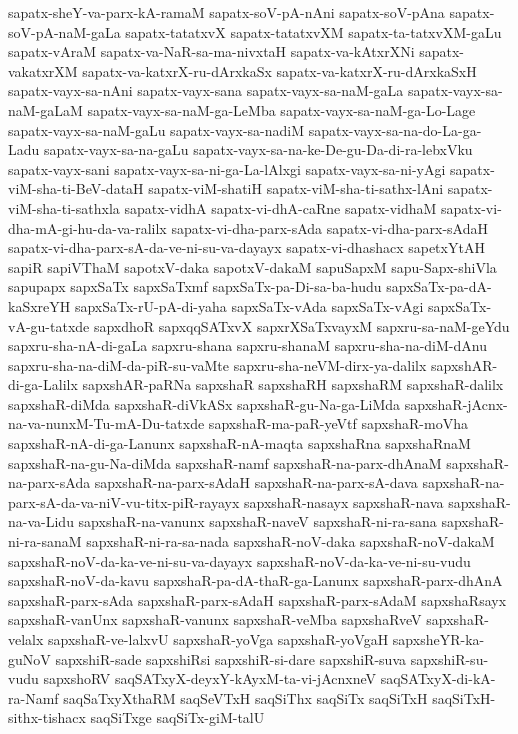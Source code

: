 {sapatx-sheY-va-parx-kA-ramaM
sapatx-soV-pA-nAni
sapatx-soV-pAna
sapatx-soV-pA-naM-gaLa
sapatx-tatatxvX
sapatx-tatatxvXM
sapatx-ta-tatxvXM-gaLu
sapatx-vAraM
sapatx-va-NaR-sa-ma-nivxtaH
sapatx-va-kAtxrXNi
sapatx-vakatxrXM
sapatx-va-katxrX-ru-dArxkaSx
sapatx-va-katxrX-ru-dArxkaSxH
sapatx-vayx-sa-nAni
sapatx-vayx-sana
sapatx-vayx-sa-naM-gaLa
sapatx-vayx-sa-naM-gaLaM
sapatx-vayx-sa-naM-ga-LeMba
sapatx-vayx-sa-naM-ga-Lo-Lage
sapatx-vayx-sa-naM-gaLu
sapatx-vayx-sa-nadiM
sapatx-vayx-sa-na-do-La-ga-Ladu
sapatx-vayx-sa-na-gaLu
sapatx-vayx-sa-na-ke-De-gu-Da-di-ra-lebxVku
sapatx-vayx-sani
sapatx-vayx-sa-ni-ga-La-lAlxgi
sapatx-vayx-sa-ni-yAgi
sapatx-viM-sha-ti-BeV-dataH
sapatx-viM-shatiH
sapatx-viM-sha-ti-sathx-lAni
sapatx-viM-sha-ti-sathxla
sapatx-vidhA
sapatx-vi-dhA-caRne
sapatx-vidhaM
sapatx-vi-dha-mA-gi-hu-da-va-ralilx
sapatx-vi-dha-parx-sAda
sapatx-vi-dha-parx-sAdaH
sapatx-vi-dha-parx-sA-da-ve-ni-su-va-dayayx
sapatx-vi-dhashacx
sapetxYtAH
sapiR
sapiVThaM
sapotxV-daka
sapotxV-dakaM
sapuSapxM
sapu-Sapx-shiVla
sapupapx
sapxSaTx
sapxSaTxmf
sapxSaTx-pa-Di-sa-ba-hudu
sapxSaTx-pa-dA-kaSxreYH
sapxSaTx-rU-pA-di-yaha
sapxSaTx-vAda
sapxSaTx-vAgi
sapxSaTx-vA-gu-tatxde
sapxdhoR
sapxqqSATxvX
sapxrXSaTxvayxM
sapxru-sa-naM-geYdu
sapxru-sha-nA-di-gaLa
sapxru-shana
sapxru-shanaM
sapxru-sha-na-diM-dAnu
sapxru-sha-na-diM-da-piR-su-vaMte
sapxru-sha-neVM-dirx-ya-dalilx
sapxshAR-di-ga-Lalilx
sapxshAR-paRNa
sapxshaR
sapxshaRH
sapxshaRM
sapxshaR-dalilx
sapxshaR-diMda
sapxshaR-diVkASx
sapxshaR-gu-Na-ga-LiMda
sapxshaR-jAcnx-na-va-nunxM-Tu-mA-Du-tatxde
sapxshaR-ma-paR-yeVtf
sapxshaR-moVha
sapxshaR-nA-di-ga-Lanunx
sapxshaR-nA-maqta
sapxshaRna
sapxshaRnaM
sapxshaR-na-gu-Na-diMda
sapxshaR-namf
sapxshaR-na-parx-dhAnaM
sapxshaR-na-parx-sAda
sapxshaR-na-parx-sAdaH
sapxshaR-na-parx-sA-dava
sapxshaR-na-parx-sA-da-va-niV-vu-titx-piR-rayayx
sapxshaR-nasayx
sapxshaR-nava
sapxshaR-na-va-Lidu
sapxshaR-na-vanunx
sapxshaR-naveV
sapxshaR-ni-ra-sana
sapxshaR-ni-ra-sanaM
sapxshaR-ni-ra-sa-nada
sapxshaR-noV-daka
sapxshaR-noV-dakaM
sapxshaR-noV-da-ka-ve-ni-su-va-dayayx
sapxshaR-noV-da-ka-ve-ni-su-vudu
sapxshaR-noV-da-kavu
sapxshaR-pa-dA-thaR-ga-Lanunx
sapxshaR-parx-dhAnA
sapxshaR-parx-sAda
sapxshaR-parx-sAdaH
sapxshaR-parx-sAdaM
sapxshaRsayx
sapxshaR-vanUnx
sapxshaR-vanunx
sapxshaR-veMba
sapxshaRveV
sapxshaR-velalx
sapxshaR-ve-lalxvU
sapxshaR-yoVga
sapxshaR-yoVgaH
sapxsheYR-ka-guNoV
sapxshiR-sade
sapxshiRsi
sapxshiR-si-dare
sapxshiR-suva
sapxshiR-su-vudu
sapxshoRV
saqSATxyX-deyxY-kAyxM-ta-vi-jAcnxneV
saqSATxyX-di-kA-ra-Namf
saqSaTxyXthaRM
saqSeVTxH
saqSiThx
saqSiTx
saqSiTxH
saqSiTxH-sithx-tishacx
saqSiTxge
saqSiTx-giM-talU
}
